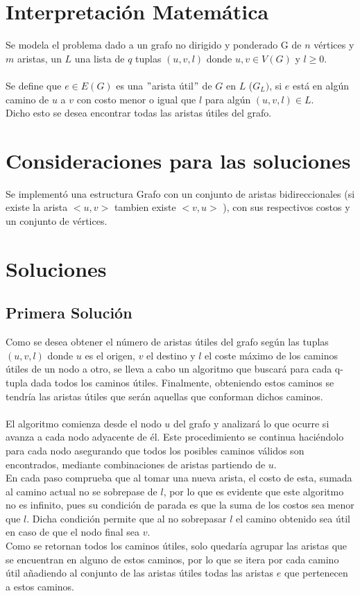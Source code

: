 \documentclass{article}
\begin{document}
\section{Interpretación Matemática}

Se modela el problema dado a un grafo no dirigido y ponderado G de $n$ vértices y $m$ aristas, un $L$ una lista de $q$ tuplas $(u,v,l)$ donde $u,v \in V(G)$ y $l \geq 0$.
\\
\\
Se define que $e \in E(G)$ es una $"$arista útil$"$ de $G$ en $L$ ($G_{L})$, si $e$ está en algún camino de $u$ a $v$ con costo menor o igual que $l$ para algún $(u,v,l) \in L$.
\\
Dicho esto se desea encontrar todas las aristas útiles del grafo.

\section{Consideraciones para las soluciones}
Se implementó una estructura Grafo con un conjunto de aristas bidireccionales (si existe la arista $<u,v>$ tambien existe $<v,u>$ ), con sus respectivos costos y un conjunto de vértices.

\section{Soluciones}
\subsection{Primera Solución}
Como se desea obtener el número de aristas útiles del grafo según las tuplas $(u,v,l)$ donde $u$ es el origen, $v$ el destino y $l$ el coste máximo de los caminos útiles de un nodo a otro, se lleva a cabo un algoritmo que buscará para cada q-tupla dada todos los caminos útiles. Finalmente, obteniendo estos caminos se tendría las aristas útiles que serán aquellas que conforman dichos caminos.
\\
\\
El algoritmo comienza desde el nodo $u$ del grafo y analizará lo que ocurre si avanza a cada nodo adyacente de él. Este procedimiento se continua haciéndolo para cada nodo asegurando que todos los posibles caminos válidos son encontrados, mediante combinaciones de aristas partiendo de $u$.
\\
En cada paso comprueba que al tomar una nueva arista, el costo de esta, sumada al camino actual no se sobrepase de $l$, por lo que es evidente que este algoritmo no es infinito, pues su condición de parada es que la suma de los costos sea menor que $l$. Dicha condición permite que al no sobrepasar $l$ el camino obtenido sea útil en caso de que el nodo final sea $v$.
\\
Como se retornan todos los caminos útiles, solo quedaría agrupar las aristas que se encuentran en alguno de estos caminos, por lo que se itera por cada camino útil añadiendo al conjunto de las aristas útiles todas las aristas $e$ que pertenecen a estos caminos.
\end{document}
